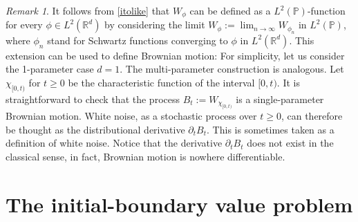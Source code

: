 \documentclass[10pt,a4paper]{article}
\theoremstyle{plain}
\theoremstyle{definition}
\theoremstyle{remark}
\newtheorem{remark}[theorem]{Remark}
\numberwithin{equation}{section}
\newcommand{\R}{\mathbb{R}}
\begin{document}
\begin{remark}
It follows from \eqref{itolike} that $W_\phi $ can be defined as a $L^2 (\mathbb{P})$-function for every $\phi \in L^2 ( \R^d)$ by considering the limit $W_\phi := \lim_{n \to \infty} W_{ \phi_n} $ in $L^2(\mathbb{P})$, where $\phi_n$ stand for Schwartz functions converging to $\phi$ in $L^2 ( \R^d)$. 
This extension can be used to define Brownian motion: 
For simplicity, let us consider the 1-parameter case  $d=1$.
The multi-parameter construction is analogous. 
Let $ \chi_{[0,t)} $ for $t \geq 0$ be the characteristic function of the interval $[0,t)$. It is straightforward to check that the process $B_t  := W_{\chi_{[0,t)}  } $ is a single-parameter Brownian motion. 
White noise, as a stochastic process over $t \geq 0$, can therefore be thought as the distributional derivative $\partial_t B_t$. This is sometimes taken as a definition of white noise. Notice that the derivative $\partial_t B_t$ does not exist in the classical sense, in fact, Brownian motion is nowhere differentiable. 
\end{remark}


\section{The initial-boundary value problem}\label{IBVP}
\end{document}
